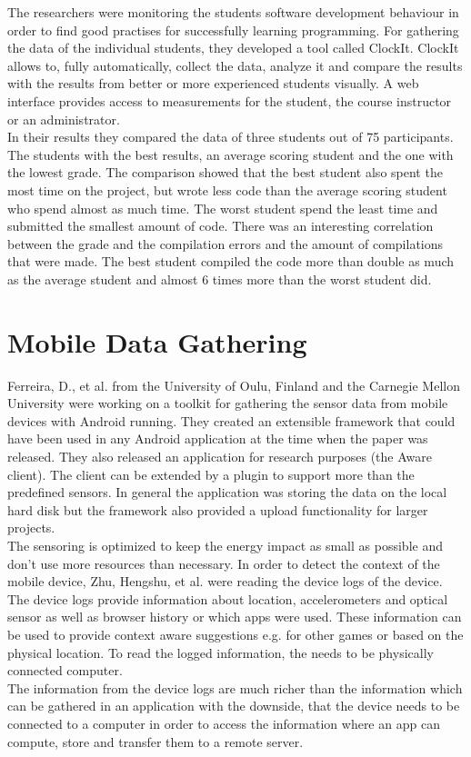 The researchers were monitoring the students software development behaviour in order to find good practises for successfully learning programming. For gathering the data of the individual students, they developed a tool called ClockIt. ClockIt allows to, fully automatically, collect the data, analyze it and compare the results with the results from better or more experienced students visually. A web interface provides access to measurements for the student, the course instructor or an administrator.\\
In their results they compared the data of three students out of 75 participants. The students with the best results, an average scoring student and the one with the lowest grade. 
The comparison showed that the best student also spent the most time on the project, but wrote less code than the average scoring student who spend almost as much time. The worst student spend the least time and submitted the smallest amount of code. There was an interesting correlation between the grade and the compilation errors and the amount of compilations that were made. The best student compiled the code more than double as much as the average student and almost 6 times more than the worst student did. \cite{norris2008clockit}

\section{Mobile Data Gathering}
Ferreira, D., et al. \cite{ferreira2015aware} from the University of Oulu, Finland and the Carnegie Mellon University were working on a toolkit for gathering the sensor data from mobile devices with Android running. They created an extensible framework that could have been used in any Android application at the time when the paper was released. They also released an application for research purposes (the Aware client). The client can be extended by a plugin to support more than the predefined sensors. In general the application was storing the data on the local hard disk but the framework also provided a upload functionality for larger projects.\\
The sensoring is optimized to keep the energy impact as small as possible and don't use more resources than necessary.
In order to detect the context of the mobile device, Zhu, Hengshu, et al. \cite{zhu2015mining} were reading the device logs of the device. The device logs provide information about location, accelerometers and optical sensor as well as browser history or which apps were used. These information can be used to provide context aware suggestions e.g. for other games or based on the physical location. To read the logged information, the needs to be physically connected computer.\\
The information from the device logs are much richer than the information which can be gathered in an application with the downside, that the device needs to be connected to a computer in order to access the information where an app can compute, store and transfer them to a remote server.

